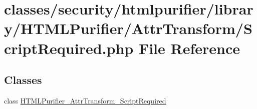 \hypertarget{ScriptRequired_8php}{\section{classes/security/htmlpurifier/library/\+H\+T\+M\+L\+Purifier/\+Attr\+Transform/\+Script\+Required.php File Reference}
\label{ScriptRequired_8php}
}
\subsection*{Classes}
\begin{DoxyCompactItemize}
\item 
class \hyperlink{classHTMLPurifier__AttrTransform__ScriptRequired}{H\+T\+M\+L\+Purifier\+\_\+\+Attr\+Transform\+\_\+\+Script\+Required}
\end{DoxyCompactItemize}
